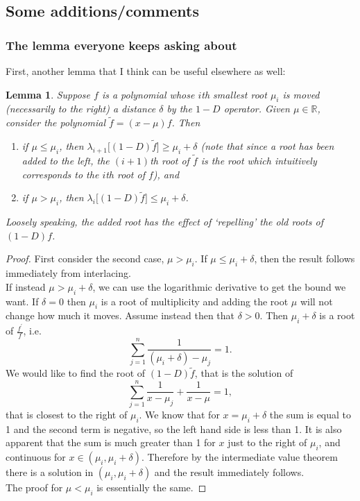 \documentclass[11pt]{article}
\newcommand{\R}{\mathbb{R}}
\newtheorem{lemma}[theorem]{Lemma}
\begin{document}
\subsection{Some additions/comments}
\subsubsection{The lemma everyone keeps asking about}
First, another lemma that I think can be useful elsewhere as well:
\begin{lemma}
	Suppose $f$ is a polynomial whose $i$th smallest root $\mu_i$ is moved (necessarily to the right) a distance $\delta$ by the $1-D$ operator. Given $\mu \in \R$, consider the polynomial $\tilde{f} = (x-\mu)f$. Then
	\begin{enumerate}
		\item if $\mu \leq \mu_i$, then $\lambda_{i+1}\big[(1-D)\tilde{f}\big] \geq \mu_i + \delta$ (note that since a root has been added to the left, the $(i+1)$th root of $\tilde{f}$ is the root which intuitively corresponds to the $i$th root of $f$), and 
		\item if $\mu > \mu_i$, then $\lambda_{i}\big[(1-D)\tilde{f}\big] \leq \mu_i + \delta$.
	\end{enumerate}
	Loosely speaking, the added root has the effect of `repelling' the old roots of $(1-D)f$.
\end{lemma}
\begin{proof}
	First consider the second case, $\mu > \mu_i$. If $\mu \leq \mu_i + \delta$, then the result follows immediately from interlacing. \\
	If instead $\mu > \mu_i + \delta$, we can use the logarithmic derivative to get the bound we want. If $\delta=0$ then $\mu_i$ is a root of multiplicity and adding the root $\mu$ will not change how much it moves. Assume instead then that $\delta>0$. Then $\mu_i+\delta$ is a root of $\frac{f^\prime}{f}$, i.e.
		\[ \sum_{j=1}^n \frac{1}{(\mu_i+\delta)-\mu_j} = 1. \]
	We would like to find the root of $(1-D)\tilde{f}$, that is the solution of
		\[ \sum_{j=1}^n \frac{1}{x-\mu_j} + \frac{1}{x-\mu} = 1, \]
	that is closest to the right of $\mu_i$. We know that for $x=\mu_i+\delta$ the sum is equal to 1 and the second term is negative, so the left hand side is less than 1. It is also apparent that the sum is much greater than 1 for $x$ just to the right of $\mu_i$, and continuous for $x \in (\mu_i, \mu_i+\delta)$. Therefore by the intermediate value theorem there is a solution in $(\mu_i, \mu_i+\delta)$ and the result immediately follows. \\
	The proof for $\mu<\mu_i$ is essentially the same.
\end{proof}
\end{document}
